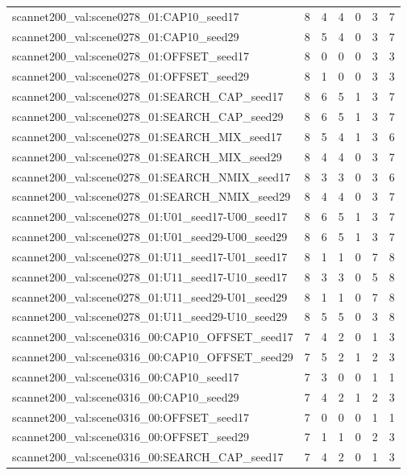 \begin{table}[t]
\begin{tabular}{lrrrrrr}
scannet200\_val:scene0278\_01:CAP10\_seed17 & 8 & 4 & 4 & 0 & 3 & 7 \\
scannet200\_val:scene0278\_01:CAP10\_seed29 & 8 & 5 & 4 & 0 & 3 & 7 \\
scannet200\_val:scene0278\_01:OFFSET\_seed17 & 8 & 0 & 0 & 0 & 3 & 3 \\
scannet200\_val:scene0278\_01:OFFSET\_seed29 & 8 & 1 & 0 & 0 & 3 & 3 \\
scannet200\_val:scene0278\_01:SEARCH\_CAP\_seed17 & 8 & 6 & 5 & 1 & 3 & 7 \\
scannet200\_val:scene0278\_01:SEARCH\_CAP\_seed29 & 8 & 6 & 5 & 1 & 3 & 7 \\
scannet200\_val:scene0278\_01:SEARCH\_MIX\_seed17 & 8 & 5 & 4 & 1 & 3 & 6 \\
scannet200\_val:scene0278\_01:SEARCH\_MIX\_seed29 & 8 & 4 & 4 & 0 & 3 & 7 \\
scannet200\_val:scene0278\_01:SEARCH\_NMIX\_seed17 & 8 & 3 & 3 & 0 & 3 & 6 \\
scannet200\_val:scene0278\_01:SEARCH\_NMIX\_seed29 & 8 & 4 & 4 & 0 & 3 & 7 \\
scannet200\_val:scene0278\_01:U01\_seed17-U00\_seed17 & 8 & 6 & 5 & 1 & 3 & 7 \\
scannet200\_val:scene0278\_01:U01\_seed29-U00\_seed29 & 8 & 6 & 5 & 1 & 3 & 7 \\
scannet200\_val:scene0278\_01:U11\_seed17-U01\_seed17 & 8 & 1 & 1 & 0 & 7 & 8 \\
scannet200\_val:scene0278\_01:U11\_seed17-U10\_seed17 & 8 & 3 & 3 & 0 & 5 & 8 \\
scannet200\_val:scene0278\_01:U11\_seed29-U01\_seed29 & 8 & 1 & 1 & 0 & 7 & 8 \\
scannet200\_val:scene0278\_01:U11\_seed29-U10\_seed29 & 8 & 5 & 5 & 0 & 3 & 8 \\
scannet200\_val:scene0316\_00:CAP10\_OFFSET\_seed17 & 7 & 4 & 2 & 0 & 1 & 3 \\
scannet200\_val:scene0316\_00:CAP10\_OFFSET\_seed29 & 7 & 5 & 2 & 1 & 2 & 3 \\
scannet200\_val:scene0316\_00:CAP10\_seed17 & 7 & 3 & 0 & 0 & 1 & 1 \\
scannet200\_val:scene0316\_00:CAP10\_seed29 & 7 & 4 & 2 & 1 & 2 & 3 \\
scannet200\_val:scene0316\_00:OFFSET\_seed17 & 7 & 0 & 0 & 0 & 1 & 1 \\
scannet200\_val:scene0316\_00:OFFSET\_seed29 & 7 & 1 & 1 & 0 & 2 & 3 \\
scannet200\_val:scene0316\_00:SEARCH\_CAP\_seed17 & 7 & 4 & 2 & 0 & 1 & 3 \\

\end{tabular}
\end{table}
